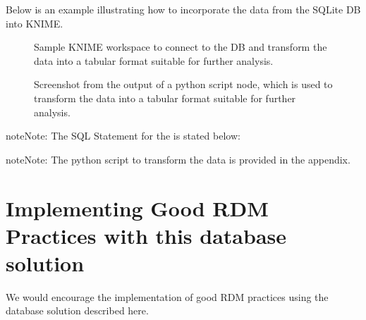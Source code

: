 \documentclass[a4paper,10pt,english]{sphinxmanual}
\begin{document}
\sphinxAtStartPar
Below is an example illustrating how to incorporate the data from the SQLite DB into KNIME.

\begin{figure}[htbp]
\centering
\capstart

\noindent{}
\caption{Sample KNIME workspace to connect to the DB and transform the data into a tabular format suitable for further analysis.}\label{\detokenize{TechnicalDetails:id11}}\end{figure}

\begin{figure}[htbp]
\centering
\capstart

\noindent{}
\caption{Screenshot from the output of a python script node, which is used to transform the data into a tabular format suitable for further analysis.}\label{\detokenize{TechnicalDetails:id12}}\end{figure}

\begin{sphinxadmonition}{note}{Note:}
\sphinxAtStartPar
The SQL Statement for the  is stated below:

\begin{sphinxVerbatim}[commandchars=\\\{\}]
\end{sphinxVerbatim}
\end{sphinxadmonition}

\begin{sphinxadmonition}{note}{Note:}
\sphinxAtStartPar
The python script to transform the data is provided in the appendix.
\end{sphinxadmonition}


\section{Implementing Good RDM Practices with this database solution}
\label{\detokenize{TechnicalDetails:implementing-good-rdm-practices-with-this-database-solution}}
\sphinxAtStartPar
We would encourage the implementation of good RDM practices using the database solution described here.
\end{document}
